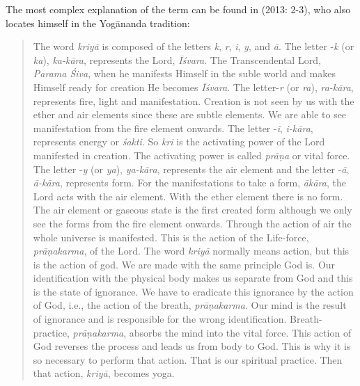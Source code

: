 The most complex explanation of the term can be found in \citeauthor{kriyayoganityananda2013} (2013: 2-3), who also locates himself in the Yogānanda tradition: \begin{quote}
  The word \textit{kriyā} is composed of the letters \textit{k}, \textit{r}, \textit{i}, \textit{y}, and \textit{ā}. The letter -\textit{k} (or \textit{ka}), \textit{ka-kāra}, represents the Lord, \textit{Īśvara}. The Transcendental Lord, \textit{Parama Śiva}, when he manifests Himself in the suble world and makes Himself ready for creation He becomes \textit{Īśvara}. The letter-\textit{r} (or \textit{ra}), \textit{ra-kāra}, represents fire, light and manifestation. Creation is not seen by us with the ether and air elements since these are subtle elements. We are able to see manifestation from the fire element onwards. The letter -\textit{i}, \textit{i-kāra}, represents energy or \textit{śakti}. So \textit{kri} is the activating power of the Lord manifested in creation. The activating power is called \textit{prāṇa} or vital force. The letter -\textit{y} (or \textit{ya}), \textit{ya-kāra}, represents the air element and the letter -\textit{ā}, \textit{ā-kāra}, represents form. For the manifestations to take a form, \textit{ākāra}, the Lord acts with the air element. With the ether element there is no form. The air element or gaseous state is the first created form although we only see the forms from the fire element onwards. Through the action of air the whole universe is manifested. This is the action of the Life-force, \textit{prāṇakarma}, of the Lord. The word \textit{kriyā} normally means action, but this is the action of god. We are made with the same principle God is. Our identification with the physical body makes us separate from God and this is the state of ignorance. We have to eradicate this ignorance by the action of God, i.e., the action of the breath, \textit{prāṇakarma}. Our mind is the result of ignorance and is responsible for the wrong identification. Breath-practice, \textit{prāṇakarma}, absorbs the mind into the vital force. This action of God reverses the process and leads us from body to God. This is why it is so necessary to perform that action. That is our spiritual practice. Then that action, \textit{kriyā}, becomes yoga. \end{quote}
